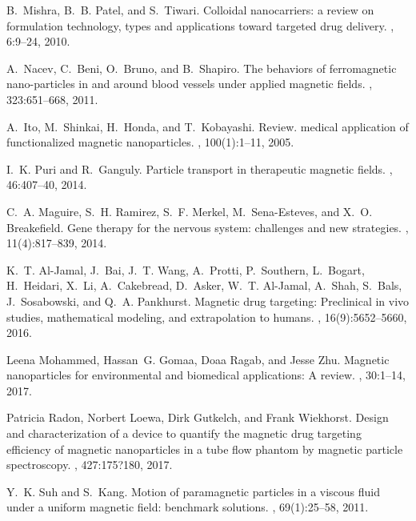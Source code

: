 \begin{thebibliography}{10}
B.~Mishra, B.~B. Patel, and S.~Tiwari.
\newblock Colloidal nanocarriers: a review on formulation technology, types and
  applications toward targeted drug delivery.
,
  6:9--24, 2010.

A.~Nacev, C.~Beni, O.~Bruno, and B.~Shapiro.
\newblock The behaviors of ferromagnetic nano-particles in and around blood
  vessels under applied magnetic fields.
, 323:651--668, 2011.

A.~Ito, M.~Shinkai, H.~Honda, and T.~Kobayashi.
\newblock Review. medical application of functionalized magnetic nanoparticles.
, 100(1):1--11, 2005.

I.~K. Puri and R.~Ganguly.
\newblock Particle transport in therapeutic magnetic fields.
, 46:407--40, 2014.

C.~A. Maguire, S.~H. Ramirez, S.~F. Merkel, M.~Sena-Esteves, and X.~O.
  Breakefield.
\newblock Gene therapy for the nervous system: challenges and new strategies.
, 11(4):817--839, 2014.

K.~T. Al-Jamal, J.~Bai, J.~T. Wang, A.~Protti, P.~Southern, L.~Bogart,
  H.~Heidari, X.~Li, A.~Cakebread, D.~Asker, W.~T. Al-Jamal, A.~Shah, S.~Bals,
  J.~Sosabowski, and Q.~A. Pankhurst.
\newblock Magnetic drug targeting: Preclinical in vivo studies, mathematical
  modeling, and extrapolation to humans.
, 16(9):5652--5660, 2016.

Leena Mohammed, Hassan~G. Gomaa, Doaa Ragab, and Jesse Zhu.
\newblock Magnetic nanoparticles for environmental and biomedical applications:
  A review.
, 30:1--14, 2017.

Patricia Radon, Norbert Loewa, Dirk Gutkelch, and Frank Wiekhorst.
\newblock Design and characterization of a device to quantify the magnetic drug
  targeting efficiency of magnetic nanoparticles in a tube flow phantom by
  magnetic particle spectroscopy.
, 427:175?180, 2017.

Y.~K. Suh and S.~Kang.
\newblock Motion of paramagnetic particles in a viscous fluid under a uniform
  magnetic field: benchmark solutions.
, 69(1):25--58, 2011.


\end{thebibliography}
